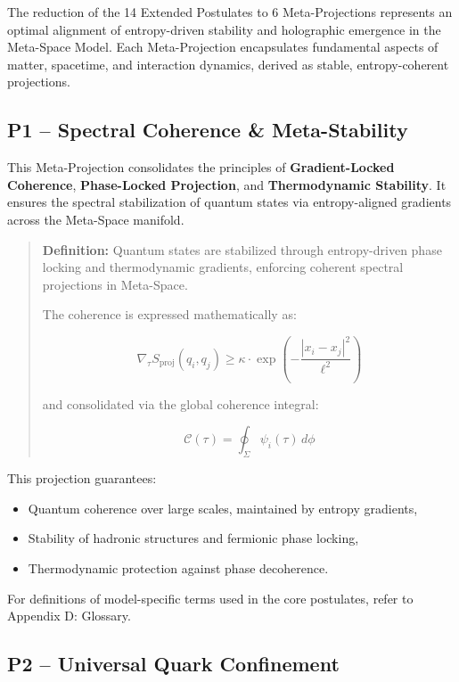 \documentclass[10.5pt,a4paper]{article}
\begin{document}
The reduction of the 14 Extended Postulates to 6 Meta-Projections represents an optimal alignment of entropy-driven 
stability and holographic emergence in the Meta-Space Model. Each Meta-Projection encapsulates fundamental aspects 
of matter, spacetime, and interaction dynamics, derived as stable, entropy-coherent projections.

\subsection{P1 – Spectral Coherence \& Meta-Stability}

This Meta-Projection consolidates the principles of \textbf{Gradient-Locked Coherence}, 
\textbf{Phase-Locked Projection}, and \textbf{Thermodynamic Stability}. 
It ensures the spectral stabilization of quantum states via entropy-aligned gradients across the Meta-Space manifold.

\begin{quote}
\textbf{Definition:}  
Quantum states are stabilized through entropy-driven phase locking and thermodynamic gradients, enforcing coherent spectral projections in Meta-Space.

The coherence is expressed mathematically as:

\[
\nabla_\tau S_{\text{proj}}(q_i, q_j) \geq \kappa \cdot \exp\left(-\frac{|x_i - x_j|^2}{\ell^2}\right)
\]

and consolidated via the global coherence integral:

\[
\mathcal{C}(\tau) = \oint_\Sigma \psi_i(\tau) \, d\phi
\]
\end{quote}

This projection guarantees:
\begin{itemize}
    \item Quantum coherence over large scales, maintained by entropy gradients,
    \item Stability of hadronic structures and fermionic phase locking,
    \item Thermodynamic protection against phase decoherence.
\end{itemize}

For definitions of model-specific terms used in the core postulates, refer to Appendix D: Glossary.

\subsection{P2 – Universal Quark Confinement}
\end{document}

